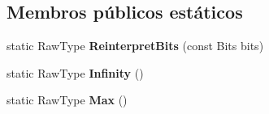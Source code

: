 \subsection*{Membros públicos estáticos}
\begin{DoxyCompactItemize}
\item 
\hypertarget{classtesting_1_1internal_1_1FloatingPoint_ac551f793522e54fbd8a25acb79eac5b1}{static Raw\-Type {\bfseries Reinterpret\-Bits} (const Bits bits)}\label{classtesting_1_1internal_1_1FloatingPoint_ac551f793522e54fbd8a25acb79eac5b1}

\item 
\hypertarget{classtesting_1_1internal_1_1FloatingPoint_a460027cc19cf01ae8e09cc3796b2b575}{static Raw\-Type {\bfseries Infinity} ()}\label{classtesting_1_1internal_1_1FloatingPoint_a460027cc19cf01ae8e09cc3796b2b575}

\item 
\hypertarget{classtesting_1_1internal_1_1FloatingPoint_aae5954d8a57d3ff0987c6930cb68e114}{static Raw\-Type {\bfseries Max} ()}\label{classtesting_1_1internal_1_1FloatingPoint_aae5954d8a57d3ff0987c6930cb68e114}

\end{DoxyCompactItemize}
